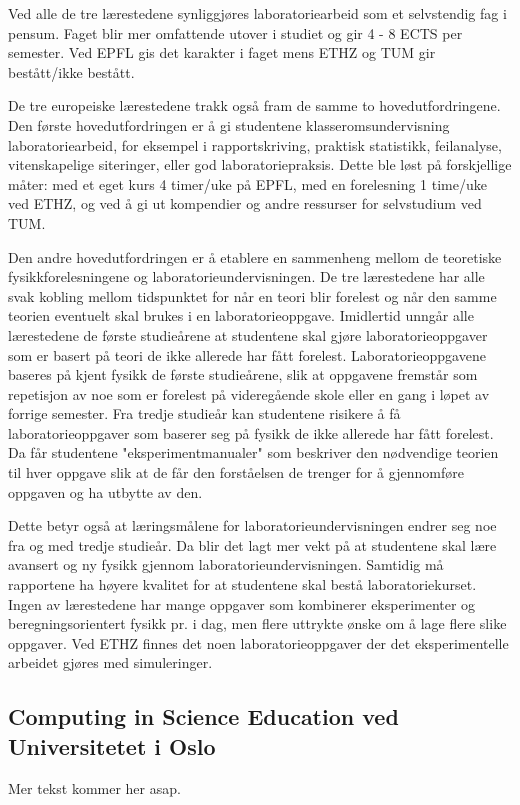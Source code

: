 \documentclass{article}
\begin{document}
Ved alle de tre lærestedene synliggjøres laboratoriearbeid som et selvstendig fag i pensum. Faget blir mer omfattende utover i studiet og gir 4 - 8 ECTS per semester. Ved EPFL gis det karakter i faget mens ETHZ og TUM gir bestått/ikke bestått.  

De tre europeiske lærestedene trakk også fram de samme to hovedutfordringene. Den første hovedutfordringen er å gi studentene klasseromsundervisning laboratoriearbeid, for eksempel i rapportskriving, praktisk statistikk, feilanalyse, vitenskapelige siteringer, eller god laboratoriepraksis. Dette ble løst på forskjellige måter: med et eget kurs 4 timer/uke på EPFL, med en forelesning 1 time/uke ved ETHZ, og ved å gi ut kompendier og andre ressurser for selvstudium ved TUM.

Den andre hovedutfordringen er å etablere en sammenheng mellom de teoretiske fysikkforelesningene og laboratorieundervisningen. De tre lærestedene har alle svak kobling mellom tidspunktet for når en teori blir forelest og når den samme teorien eventuelt skal brukes i en laboratorieoppgave. Imidlertid unngår alle lærestedene de første studieårene at studentene skal gjøre laboratorieoppgaver som er basert på teori de ikke allerede har fått forelest. Laboratorieoppgavene baseres på kjent fysikk de første studieårene, slik at oppgavene fremstår som repetisjon av noe som er forelest på videregående skole eller en gang i løpet av forrige semester. Fra tredje studieår kan studentene risikere å få laboratorieoppgaver som baserer seg på fysikk de ikke allerede har fått forelest. Da får studentene "eksperimentmanualer" som beskriver den nødvendige teorien til hver oppgave slik at de får den forståelsen de trenger for å gjennomføre oppgaven og ha utbytte av den. 

Dette betyr også at læringsmålene for laboratorieundervisningen endrer seg noe fra og med tredje studieår. Da blir det lagt mer vekt på at studentene skal lære avansert og ny fysikk gjennom laboratorieundervisningen. Samtidig må rapportene ha høyere kvalitet for at studentene skal bestå laboratoriekurset. Ingen av lærestedene har mange oppgaver som kombinerer eksperimenter og beregningsorientert fysikk pr. i dag, men flere uttrykte ønske om å lage flere slike oppgaver. Ved ETHZ finnes det noen laboratorieoppgaver der det eksperimentelle arbeidet gjøres med simuleringer.

\subsection{Computing in Science Education ved Universitetet i Oslo} 
Mer tekst kommer her asap.
\end{document}
